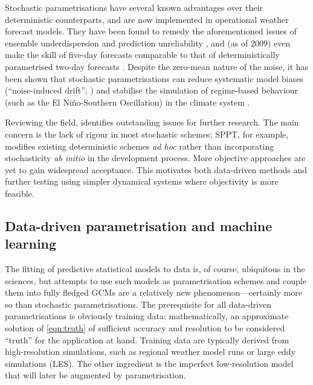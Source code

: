 \documentclass[titlepage,twoside]{article}
\numberwithin{equation}{section}
\begin{document}
Stochastic parametrisations have several known advantages over their
deterministic counterparts, and are now implemented in operational weather
forecast models. They have been found to remedy the aforementioned issues of
ensemble underdispersion and prediction unreliability
\parencite{palmer2005,berner2017}, and (as of 2009) even make the skill of
five-day forecasts comparable to that of deterministically parametrised two-day
forecasts \parencite{palmer2019}. Despite the zero-mean nature of the noise, it
has been shown that stochastic parametrisations can reduce systematic model
biases (``noise-induced drift''; \textcite{palmer2005}) and stabilise the
simulation of regime-based behaviour (such as the El Ni\~{n}o-Southern
Oscillation) in the climate system \parencite{berner2017}.

Reviewing the field, \textcite{palmer2019} identifies outstanding issues for
further research. The main concern is the lack of rigour in most stochastic
schemes; SPPT, for example, modifies existing deterministic schemes \emph{ad
hoc} rather than incorporating stochasticity \emph{ab initio} in the
development process. More objective approaches are yet to gain widespread
acceptance. This motivates both data-driven methods and further testing
using simpler dynamical systems where objectivity is more feasible.


\subsection{Data-driven parametrisation and machine learning}
The fitting of predictive statistical models to data is, of course, ubiquitous
in the sciences, but attempts to use such models as parametrisation schemes and
couple them into fully fledged GCMs are a relatively new phenomenon---certainly
more so than stochastic parametrisations. The prerequisite for all data-driven
parametrisations is obviously training data: mathematically, an approximate
solution of \cref{eqn:truth} of sufficient accuracy and resolution to be
considered ``truth'' for the application at hand. Training data are typically
derived from high-resolution simulations, such as regional weather model runs
or large eddy simulations (LES). The other ingredient is the imperfect
low-resolution model that will later be augmented by parametrisation.
\end{document}
